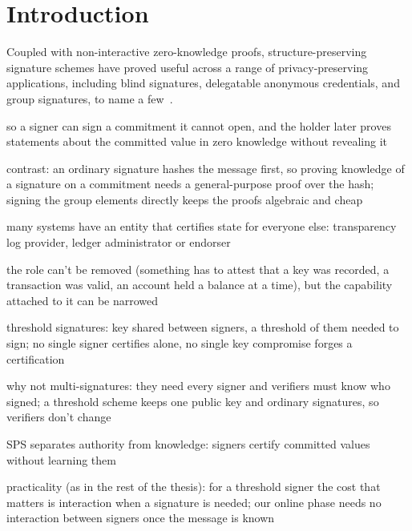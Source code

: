 \section{Introduction}\label{sec:tsps-introduction}

Coupled with non-interactive zero-knowledge proofs, structure-preserving
signature schemes have proved
useful across a range of privacy-preserving applications, including blind
signatures, delegatable anonymous credentials, and group signatures, to name a
few~\cite{AFRICACRYPT:FucVer10,CCS:CamDriDub17,RSA:CriLys19,PoPETS:MSBM23,AC:Groth06,AC:Groth07,C:LibPetYun15}.

\begin{outline}
  \item so a signer can sign a commitment it cannot open, and the holder later
proves statements about the committed value in zero knowledge without revealing it
  \item contrast: an ordinary signature hashes the message first, so proving
knowledge of a signature on a commitment needs a general-purpose proof over the
hash; signing the group elements directly keeps the proofs algebraic and cheap
\end{outline}

\begin{outline}
  \item many systems have an entity that certifies state for everyone else:
transparency log provider, ledger administrator or endorser
  \item the role can't be removed (something has to attest that a key was
recorded, a transaction was valid, an account held a balance at a time), but the
capability attached to it can be narrowed
  \item threshold signatures: key shared between signers, a threshold of them
needed to sign; no single signer certifies alone, no single key compromise
forges a certification
  \item why not multi-signatures: they need every signer and verifiers must know
who signed; a threshold scheme keeps one public key and ordinary signatures, so
verifiers don't change
  \item SPS separates authority from knowledge: signers certify committed values
without learning them
  \item practicality (as in the rest of the thesis): for a threshold signer the
cost that matters is interaction when a signature is needed; our online phase
needs no interaction between signers once the message is known
\end{outline}

